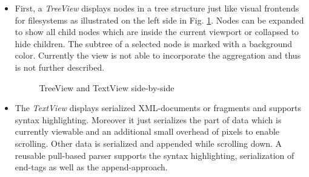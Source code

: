 \begin{itemize}
\item
First, a \emph{TreeView} displays nodes in a tree structure just like visual frontends for filesystems as illustrated on the left side in Fig. \ref{fig:treetextview}. Nodes can be expanded to show all child nodes which are inside the current viewport or collapsed to hide children. The subtree of a selected node is marked with a background color. Currently the view is not able to incorporate the aggregation and thus is not further described.

\begin{figure}[tb]
\caption{\label{fig:treetextview} TreeView and TextView side-by-side}
\end{figure}

\item
The \emph{TextView} displays serialized XML-documents or fragments and supports syntax highlighting. Moreover it just serializes the part of data which is currently viewable and an additional small overhead of pixels to enable scrolling. Other data is serialized and appended while scrolling down. A reusable pull-based parser supports the syntax highlighting, serialization of end-tags as well as the append-approach.%


\end{itemize}
